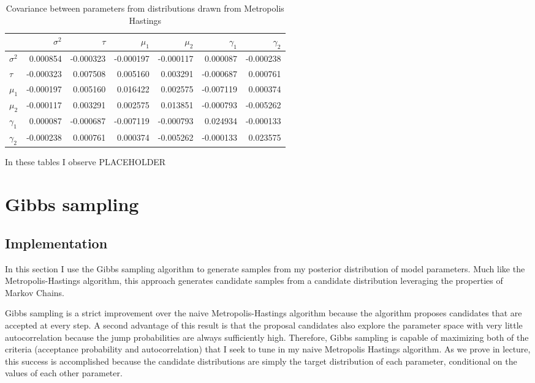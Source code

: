 \documentclass{article}
\begin{document}
\begin{table}[H]
  \begin{center}
    \begin{tabular}{lrrrrrr}
      {} & $\sigma^2$ & $\tau$ & $\mu_1$ & $\mu_2$ & $\gamma_1$ & $\gamma_2$ \\
      \midrule
      $\sigma^2$   &  0.000854 & -0.000323 & -0.000197 & -0.000117 &  0.000087 & -0.000238 \\
      $\tau$  & -0.000323 &  0.007508 &  0.005160 &  0.003291 & -0.000687 &  0.000761 \\
      $\mu_1$  & -0.000197 &  0.005160 &  0.016422 &  0.002575 & -0.007119 &  0.000374 \\
      $\mu_2$  & -0.000117 &  0.003291 &  0.002575 &  0.013851 & -0.000793 & -0.005262 \\
      $\gamma_1$ &  0.000087 & -0.000687 & -0.007119 & -0.000793 &  0.024934 & -0.000133 \\
      $\gamma_2$ & -0.000238 &  0.000761 &  0.000374 & -0.005262 & -0.000133 &  0.023575 \\
      \bottomrule
      \end{tabular}
  \end{center}
  \caption{\label{tab:mh_covar} Covariance between parameters from distributions drawn from Metropolis Hastings}
\end{table}


In these tables I observe PLACEHOLDER




\section{Gibbs sampling}
\subsection{Implementation}
In this section I use the Gibbs sampling algorithm to generate samples from my posterior distribution of model parameters. Much like the Metropolis-Hastings algorithm, this approach generates candidate samples from a candidate distribution leveraging the properties of Markov Chains. 

Gibbs sampling is a strict improvement over the naive Metropolis-Hastings algorithm because the algorithm proposes candidates that are accepted at every step. A second advantage of this result is that the proposal candidates also explore the parameter space with very little autocorrelation because the jump probabilities are always sufficiently high. Therefore, Gibbs sampling is capable of maximizing both of the criteria (acceptance probability and autocorrelation) that I seek to tune in my naive Metropolis Hastings algorithm. As we prove in lecture, this success is accomplished because the candidate distributions are simply the target distribution of each parameter, conditional on the values of each other parameter. 
\end{document}
